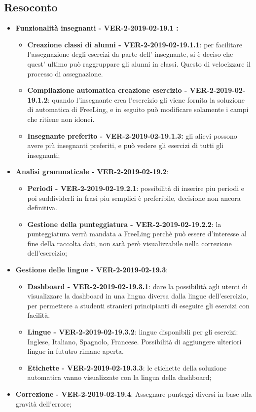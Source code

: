 \documentclass[a4paper, oneside, openany, dvipsnames, table]{article}
\begin{document}
\subsection{Resoconto}
\begin{itemize}
	\item \textbf{Funzionalità insegnanti - VER-2-2019-02-19.1 :} 
	\begin{itemize}
		\item \textbf{Creazione classi di alunni - VER-2-2019-02-19.1.1}: per facilitare l'assegnazione degli esercizi da parte dell' insegnante,
		 si è deciso che quest' ultimo può raggruppare gli alunni in classi. Questo di velocizzare
		il processo di assegnazione.
		\item \textbf{Compilazione automatica creazione esercizio - VER-2-2019-02-19.1.2}:
		quando l'insegnante crea l'esercizio gli viene fornita la soluzione di automatica di FreeLing,
		e in seguito può modificare solamente i campi che ritiene non idonei.
		\item \textbf{Insegnante preferito - VER-2-2019-02-19.1.3:} 
		gli alievi possono avere più insegnanti preferiti, e può vedere gli esercizi di tutti gli insegnanti;
	\end{itemize}
	\item \textbf{Analisi grammaticale - VER-2-2019-02-19.2}:
	\begin{itemize}
		\item \textbf{Periodi - VER-2-2019-02-19.2.1}: possibilità di inserire piu periodi e poi suddividerli in frasi piu semplici è preferibile, decisione non ancora definitiva.
		\item \textbf{Gestione della punteggiatura - VER-2-2019-02-19.2.2}: la punteggiatura verrà mandata a FreeLing perchè 
		può essere d'interesse al fine della raccolta dati, non sarà però visualizzabile nella correzione dell'esercizio;
	\end{itemize}
	\item \textbf{Gestione delle lingue - VER-2-2019-02-19.3}: 
	\begin{itemize}
		\item \textbf{Dashboard - VER-2-2019-02-19.3.1}: dare la possibilità agli utenti di visualizzare la dashboard in una lingua diversa dalla lingue dell'esercizio,
		per permettere a studenti stranieri principianti di eseguire gli esercizi con facilità.
		\item \textbf{Lingue - VER-2-2019-02-19.3.2}: lingue disponibili per gli esercizi: 
		Inglese, Italiano, Spagnolo, Francese. Possibilità di aggiungere ulteriori lingue in fututro rimane aperta.
		\item \textbf{Etichette - VER-2-2019-02-19.3.3}: le etichette della soluzione automatica
		vanno visualizzate con la lingua della dashboard;
	\end{itemize}
	\item \textbf{Correzione - VER-2-2019-02-19.4}:
	Assegnare punteggi diversi in base alla gravità dell'errore;
	

\end{itemize}
\end{document}
